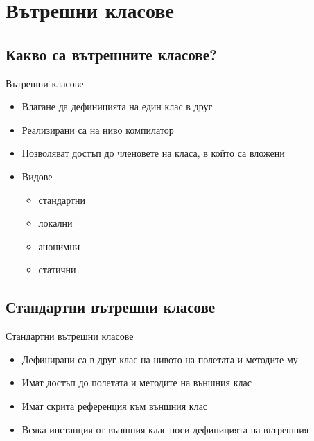 \documentclass{beamer}
\begin{document}
\section{Вътрешни класове}
\subsection{Какво са вътрешните класове?}
\begin{frame}{Вътрешни класове}
  
  \begin{itemize}
  \item Влагане да дефиницията на един клас в друг 
  \item Реализирани са на ниво компилатор 
  \item Позволяват достъп до членовете на класа, в който са вложени 
  \item Видове 
    \begin{itemize}
      \item стандартни 
      \item локални  
      \item анонимни 
      \item статични 
    \end{itemize}
  \end{itemize}
\end{frame}

\subsection{Стандартни вътрешни класове}
\begin{frame}{Стандартни вътрешни класове}
  
  \begin{itemize}
  \item Дефинирани са в друг клас на нивото на полетата и методите му 
  \item Имат достъп до полетата и методите на външния клас 
  \item Имат скрита референция към външния клас 
  \item Всяка инстанция от външния клас носи дефиницията на вътрешния
  \end{itemize}
\end{frame}
\end{document}
